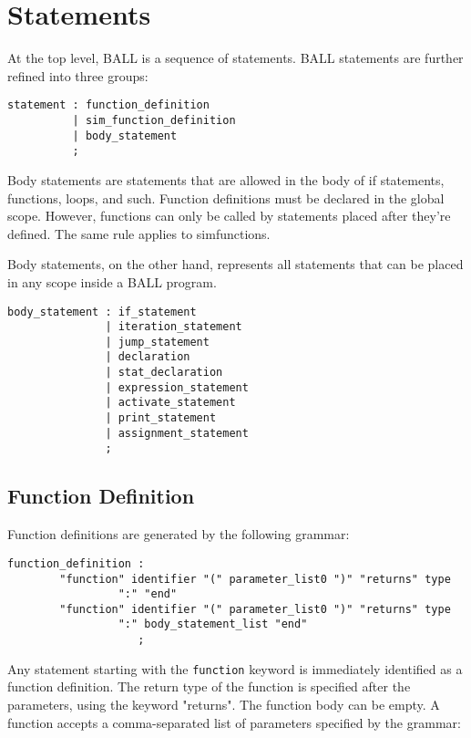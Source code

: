 \section{Statements}\label{Stmts}
At the top level, BALL is a sequence of statements. BALL statements
are further refined into three groups:

\begin{verbatim}
statement : function_definition
          | sim_function_definition
          | body_statement
          ;
\end{verbatim}

Body statements are statements that are allowed in the body of if
statements, functions, loops, and such. Function definitions must be
declared in the global scope. However, functions can only be called by
statements placed after they're defined. The same rule applies to
simfunctions.

Body statements, on the other hand, represents all statements that can
be placed in any scope inside a BALL program.

\begin{verbatim}
body_statement : if_statement
               | iteration_statement
               | jump_statement
               | declaration
               | stat_declaration
               | expression_statement
               | activate_statement
               | print_statement
               | assignment_statement
               ;
\end{verbatim}

\subsection{Function Definition}\label{FuncDef}
Function definitions are generated by the following grammar:

\begin{verbatim}
function_definition : 
        "function" identifier "(" parameter_list0 ")" "returns" type
                 ":" "end"
        "function" identifier "(" parameter_list0 ")" "returns" type
                 ":" body_statement_list "end"
                    ;
\end{verbatim}

Any statement starting with the \texttt{function} keyword is
immediately identified as a function definition. The return type of
the function is specified after the parameters, using the keyword
"returns". The function body can be empty. A function accepts a
comma-separated list of parameters specified by the grammar:

